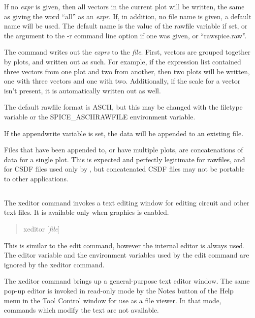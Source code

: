 If no {\it expr} is given, then all vectors in the current plot will
be written, the same as giving the word ``{\vt all}'' as an {\it
expr}.  If, in addition, no file name is given, a default name will be
used.  The default name is the value of the {\et rawfile} variable if
set, or the argument to the {\vt -r} command line option if one was
given, or ``{\vt rawspice.raw}''.
 
The command writes out the {\it exprs} to the {\it file}.  First,
vectors are grouped together by plots, and written out as such.  For
example, if the expression list contained three vectors from one plot
and two from another, then two plots will be written, one with three
vectors and one with two.  Additionally, if the scale for a vector
isn't present, it is automatically written out as well.

The default rawfile format is ASCII, but this may be changed with the
{\et filetype} variable or the {\et SPICE\_ASCIIRAWFILE} environment
variable.

If the {\et appendwrite} variable is set, the data will be appended to
an existing file.

Files that have been appended to, or have multiple plots, are
concatenations of data for a single plot.  This is expected and
perfectly legitimate for rawfiles, and for CSDF files used only by
{\WRspice}, but concatenated CSDF files may not be portable to other
applications.


\subsection{}
\label{xeditor}


The {\cb xeditor} command invokes a text editing window for editing
circuit and other text files.  It is available only when graphics is
enabled.
\begin{quote}\vt
xeditor [{\it file\/}]
\end{quote}
This is similar to the {\cb edit} command, however the internal editor
is always used.  The {\et editor} variable and the environment
variables used by the {\cb edit} command are ignored by the {\cb
xeditor} command.

The {\cb xeditor} command brings up a general-purpose text editor
window.  The same pop-up editor is invoked in read-only mode by the
{\cb Notes} button of the {\cb Help} menu in the {\cb Tool Control}
window for use as a file viewer.  In that mode, commands which modify
the text are not available.

